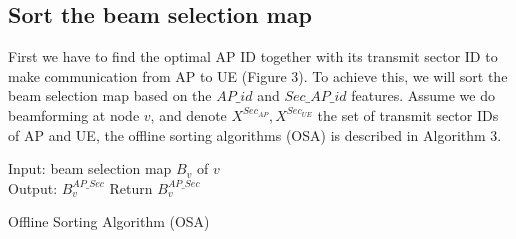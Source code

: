 \documentclass[conference]{IEEEtran}
\begin{document}
\subsection{Sort the beam selection map}
First we have to find the optimal AP ID together with its transmit sector ID to make communication from AP to UE (Figure 3). To achieve this, we will sort the beam selection map based on the $AP\_id$ and $Sec\_AP\_id$ features. Assume we do beamforming at node $v$, and denote $X^{Sec_{AP}}, X^{Sec_{UE}}$ the set of transmit sector IDs of AP and UE, the offline sorting algorithms (OSA) is described in Algorithm 3.
\begin{algorithm}[H]
	Input: beam selection map $B_{v}$ of $v$\\ 
	Output: $B^{AP\_Sec}_{v}$
	Return $B^{AP\_Sec}_{v}$
	\caption{Offline Sorting Algorithm (OSA)}
\end{algorithm}
\end{document}
